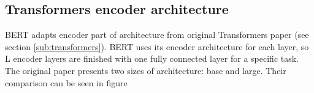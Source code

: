 \subsection{Transformers encoder architecture}
BERT adapts encoder part of architecture from original Transformers paper   \citep{Vaswani2017} (see section \ref{sub:transformers}).
BERT uses its encoder architecture for each layer, 
 so L encoder layers are finished with one fully connected layer for a specific task. The original paper presents two sizes of architecture: base and large. Their comparison can be seen in figure %
 
  

 
 
